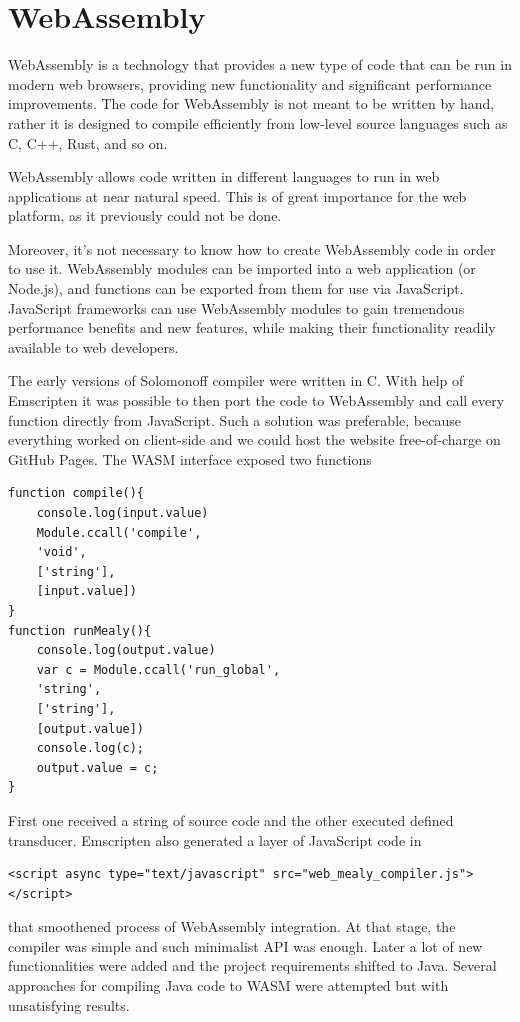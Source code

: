 \section{WebAssembly}

WebAssembly\cite{webassembly} is a technology 
that provides a new type of code 
that can be run in modern web browsers, 
providing new functionality and significant 
performance improvements. The code 
for WebAssembly is not meant to be 
written by hand, rather it is designed 
to compile efficiently from low-level 
source languages
such as C, C++, 
Rust, and so on.

WebAssembly allows code
 written
  in 
 different languages
 to run in web applications 
 at near natural speed\cite{webassembly_speed}\cite{webassembly_speed2}\cite{webassembly_speed3}. 
 This is of great importance 
 for the web platform, as 
 it previously could not be done.

Moreover, it's not necessary to know how to create WebAssembly code in order to use it. WebAssembly modules can be imported into a web application (or Node.js), and functions can be exported from them for use via JavaScript. JavaScript frameworks can use WebAssembly modules to gain tremendous performance benefits and new features, while making their functionality readily available to web developers.


The early versions of Solomonoff compiler were written in C. With help of Emscripten it was possible to then port the code to WebAssembly and call every function directly from JavaScript. Such a solution was preferable, because everything worked on client-side and we could host the website free-of-charge on GitHub
Pages. The WASM interface exposed two functions
\begin{lstlisting}
function compile(){
	console.log(input.value)
	Module.ccall('compile',
	'void',
	['string'], 
	[input.value])
}
function runMealy(){
	console.log(output.value)
	var c = Module.ccall('run_global',
	'string',
	['string'], 
	[output.value])
	console.log(c);
	output.value = c;
}
\end{lstlisting}
First one received a string of source code and the other executed defined transducer. 
Emscripten also generated a layer of JavaScript code in
\begin{lstlisting}
<script async type="text/javascript" src="web_mealy_compiler.js"></script>
\end{lstlisting}
that smoothened process of WebAssembly integration.
At that stage, the compiler was simple and such minimalist API was enough. Later a lot of new functionalities were added and the project requirements shifted to Java. Several approaches for compiling Java code to WASM were attempted but with unsatisfying results.

